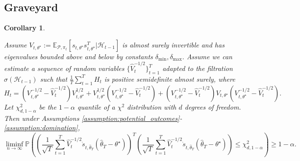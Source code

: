 \documentclass[11pt]{article}
\newtheorem{corollary}{Corollary}
\begin{document}
\begin{appendix}
\iffalse
{\color{red}
\section{Graveyard}

\begin{corollary} \label{thm:overestimate}

Assume $V_{t,\theta^{\star}} := \mathbb{E}_{\mathcal{P},\pi_{t}}\left[ s_{t,\theta^{\star}}s_{t,\theta^{\star}}^{T} | \mathcal{H}_{t-1}\right]$ is almost surely invertible and has eigenvalues bounded above and below by constants $\delta_{\text{min}}, \delta_{\text{max}}$.
Assume we can estimate a sequence of random variables $\{\hat{V}_{t}^{-1/2}\}_{t=1}^{T}$ adapted to the filtration $\sigma(\mathcal{H}_{t-1})$ such that $\frac{1}{T} \sum_{t=1}^{T} H_{t}$ is positive semidefinite almost surely, where  $$H_{t}  =\left(V_{t,\theta^{\star}}^{-1/2} - \hat{V}_{t}^{-1/2}\right)  V_{t,\theta^{\star}}^{1/2} + V_{t,\theta^{\star}}^{1/2} \left(V_{t,\theta^{\star}}^{-1/2} - \hat{V}_{t}^{-1/2}\right)  +\left(V_{t,\theta^{\star}}^{-1/2} - \hat{V}_{t}^{-1/2}\right)  V_{t,\theta^{\star}} \left(V_{t,\theta^{\star}}^{-1/2} - \hat{V}_{t}^{-1/2}\right).$$ Let $\chi^{2}_{d,1-\alpha}$ be the $1-\alpha$ quantile of a $\chi^{2}$ distribution with $d$ degrees of freedom. Then under Assumptions \ref{assumption:potential_outcomes}-\ref{assumption:domination}, 
$$\liminf_{n\rightarrow \infty} \mathbb{P} \left(  \left(\frac{1}{\sqrt{T}} \sum_{t=1}^{T}\hat{V}_{t}^{-1/2} \dot{s}_{t,\hat{\theta}_{T}} \left(\hat{\theta}_{T}- \theta^{\star} \right) \right)^{T}\left(\frac{1}{\sqrt{T}} \sum_{t=1}^{T}\hat{V}_{t}^{-1/2} \dot{s}_{t,\hat{\theta}_{T}} \left(\hat{\theta}_{T}- \theta^{\star} \right) \right)\le  \chi^{2}_{d,1-\alpha} \right) \ge 1- \alpha.$$

\end{corollary} 


}
\end{appendix}
\end{document}
